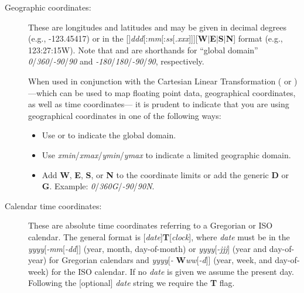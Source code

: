 \begin{description}
\item [Geographic coordinates:]  These are longitudes and latitudes and may be given in decimal degrees (e.g., -123.45417)
or in the
[\PM]\emph{ddd}[:\emph{mm}[:\emph{ss}[\emph{.xxx}]]][\textbf{W}$|$\textbf{E}$|$\textbf{S}$|$\textbf{N}]
format (e.g., 123:27:15W).  Note that  and  are shorthands for ``global domain''
\emph{0}/\emph{360}/\emph{-90}/\emph{90}
and  \emph{-180}/\emph{180}/\emph{-90}/\emph{90}, respectively.

When used in conjunction with the Cartesian Linear Transformation ( or ) ---which can be used
to map floating point data, geographical coordinates, as well as time coordinates--- it is prudent to indicate
that you are using geographical coordinates in one of the following ways:
\begin{itemize}
\item Use  or  to indicate the global domain.
\item Use \emph{xmin}/\emph{xmax}/\emph{ymin}/\emph{ymax} to indicate a limited geographic domain.
\item Add \textbf{W}, \textbf{E}, \textbf{S}, or \textbf{N} to the coordinate limits or add the generic \textbf{D} or
\textbf{G}. Example: \emph{0}/\emph{360G}/\emph{-90}/\emph{90N}.
\end{itemize}

\item [Calendar time coordinates:]  These are absolute time coordinates referring to a Gregorian or ISO calendar.
The general format is [\emph{date}]\textbf{T}[\emph{clock}], where \emph{date} must be in the
\emph{yyyy}[\emph{-mm}[\emph{-dd}]] (year, month, day-of-month)
or \emph{yyyy}[\emph{-jjj}] (year and day-of-year) for Gregorian calendars and \emph{yyyy}[\emph{-}{\bf
W}\emph{ww}[\emph{-d}]] (year, week, and
day-of-week) for the ISO calendar.  If no \emph{date} is given we assume the present day.  Following the
[optional] \emph{date} string we require the \textbf{T} flag.


\end{description}
